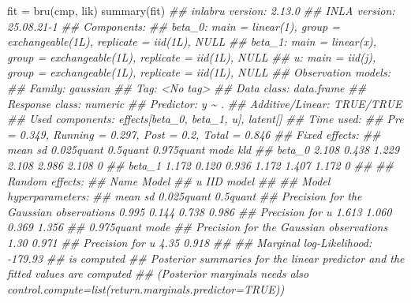 \documentclass[
  letterpaper,
  DIV=11,
  numbers=noendperiod]{scrartcl}
\newenvironment{Shaded}{\begin{snugshade}}{\end{snugshade}}
\newcommand{\DocumentationTok}[1]{\textcolor[rgb]{0.37,0.37,0.37}{\textit{#1}}}
\newcommand{\FunctionTok}[1]{\textcolor[rgb]{0.28,0.35,0.67}{#1}}
\newcommand{\NormalTok}[1]{\textcolor[rgb]{0.00,0.23,0.31}{#1}}
\newcommand{\OtherTok}[1]{\textcolor[rgb]{0.00,0.23,0.31}{#1}}
\begin{document}
\begin{Shaded}
\begin{Highlighting}[]
\NormalTok{fit }\OtherTok{=} \FunctionTok{bru}\NormalTok{(cmp, lik)}
\FunctionTok{summary}\NormalTok{(fit)}
\DocumentationTok{\#\# inlabru version: 2.13.0}
\DocumentationTok{\#\# INLA version: 25.08.21{-}1}
\DocumentationTok{\#\# Components:}
\DocumentationTok{\#\# beta\_0: main = linear(1), group = exchangeable(1L), replicate = iid(1L), NULL}
\DocumentationTok{\#\# beta\_1: main = linear(x), group = exchangeable(1L), replicate = iid(1L), NULL}
\DocumentationTok{\#\# u: main = iid(j), group = exchangeable(1L), replicate = iid(1L), NULL}
\DocumentationTok{\#\# Observation models:}
\DocumentationTok{\#\#   Family: \textquotesingle{}gaussian\textquotesingle{}}
\DocumentationTok{\#\#     Tag: \textless{}No tag\textgreater{}}
\DocumentationTok{\#\#     Data class: \textquotesingle{}data.frame\textquotesingle{}}
\DocumentationTok{\#\#     Response class: \textquotesingle{}numeric\textquotesingle{}}
\DocumentationTok{\#\#     Predictor: y \textasciitilde{} .}
\DocumentationTok{\#\#     Additive/Linear: TRUE/TRUE}
\DocumentationTok{\#\#     Used components: effects[beta\_0, beta\_1, u], latent[]}
\DocumentationTok{\#\# Time used:}
\DocumentationTok{\#\#     Pre = 0.349, Running = 0.297, Post = 0.2, Total = 0.846 }
\DocumentationTok{\#\# Fixed effects:}
\DocumentationTok{\#\#         mean    sd 0.025quant 0.5quant 0.975quant  mode kld}
\DocumentationTok{\#\# beta\_0 2.108 0.438      1.229    2.108      2.986 2.108   0}
\DocumentationTok{\#\# beta\_1 1.172 0.120      0.936    1.172      1.407 1.172   0}
\DocumentationTok{\#\# }
\DocumentationTok{\#\# Random effects:}
\DocumentationTok{\#\#   Name     Model}
\DocumentationTok{\#\#     u IID model}
\DocumentationTok{\#\# }
\DocumentationTok{\#\# Model hyperparameters:}
\DocumentationTok{\#\#                                          mean    sd 0.025quant 0.5quant}
\DocumentationTok{\#\# Precision for the Gaussian observations 0.995 0.144      0.738    0.986}
\DocumentationTok{\#\# Precision for u                         1.613 1.060      0.369    1.356}
\DocumentationTok{\#\#                                         0.975quant  mode}
\DocumentationTok{\#\# Precision for the Gaussian observations       1.30 0.971}
\DocumentationTok{\#\# Precision for u                               4.35 0.918}
\DocumentationTok{\#\# }
\DocumentationTok{\#\# Marginal log{-}Likelihood:  {-}179.93 }
\DocumentationTok{\#\#  is computed }
\DocumentationTok{\#\# Posterior summaries for the linear predictor and the fitted values are computed}
\DocumentationTok{\#\# (Posterior marginals needs also \textquotesingle{}control.compute=list(return.marginals.predictor=TRUE)\textquotesingle{})}
\end{Highlighting}
\end{Shaded}
\end{document}
